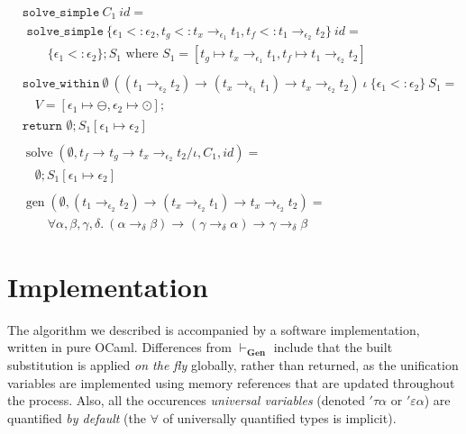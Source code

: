 \documentclass[declaration,shortabstract]{iithesis}
\theoremstyle{definition} \newtheorem{definition}{Definition}[section]
\newcommand{\arrow}[3]{{#1}\rightarrow_{#2}{#3}}
\begin{document}
\begin{align*}
  & \texttt{solve\_simple}\  C_1\ id = \\
  & \texttt{  solve\_simple}\ \{
            \epsilon_1 <: \epsilon_2,
           t_g <: \arrow{t_x}{\epsilon_1}{t_1}, 
           t_f <: \arrow{t_1}{\epsilon_2}{t_2}
        \}\ id = \\
  & \qquad \{\epsilon_1 <: \epsilon_2\} ; S_1 \text{ where }  S_1 = [t_g \mapsto \arrow{t_x}{\epsilon_1}{t_1}, t_f \mapsto \arrow{t_1}{\epsilon_2}{t_2}]
\\ \\
  & \texttt{solve\_within}\ \emptyset\
    (\arrow{(\arrow{t_1}{\epsilon_2}{t_2})}{}{\arrow{(\arrow{t_x}{\epsilon_1}{t_1})}{}{\arrow{t_x}{\epsilon_2}{t_2}}})
    \ \iota \ \{\epsilon_1 <: \epsilon_2\} \ S_1 = \\
  & \quad V = [\epsilon_1 \mapsto \ominus, \epsilon_2 \mapsto \odot] ;\\
  & \texttt{return } \emptyset ; S_1[\epsilon_1 \mapsto \epsilon_2]
\\ \\
& \operatorname{solve}(\emptyset, {\arrow{t_f}{}{\arrow{t_g}{}{\arrow{t_x}{\epsilon_2}{t_2}}}}/{\iota}, C_1, id) = 
\\ & \quad \emptyset ; S_1[\epsilon_1 \mapsto \epsilon_2]
\\ \\
& \operatorname{gen}(\emptyset, \arrow{(\arrow{t_1}{\epsilon_2}{t_2})}{}{\arrow{(\arrow{t_x}{\epsilon_2}{t_1})}{}{\arrow{t_x}{\epsilon_2}{t_2}}}) = \\
& \qquad \forall \alpha, \beta, \gamma, \delta .\ 
\arrow{(\arrow{\alpha}{\delta}{\beta})}{}{\arrow{(\arrow{\gamma}{\delta}{\alpha})}{}{\arrow{\gamma}{\delta}{\beta}}}
\end{align*}

\chapter{Implementation}
The algorithm we described is accompanied by a software implementation,
written in pure OCaml.
Differences from $\vdash_\textbf{Gen}$ include that the built substitution is
applied \textit{on the fly} globally, rather than returned,
as the unification variables are implemented using memory references that are updated throughout the process.
Also, all the occurences \textit{universal variables} (denoted $'\tau\alpha$
or $'\varepsilon\alpha$) are quantified \textit{by default}
(the $\forall$ of universally quantified types is implicit).
\end{document}
